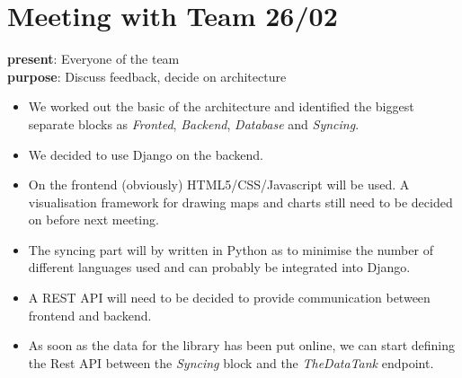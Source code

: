 \section{Meeting with Team 26/02}
{\bf present}: Everyone of the team\\
{\bf purpose}: Discuss feedback, decide on architecture\\
\begin{itemize}
  \item We worked out the basic of the architecture and identified the biggest separate blocks as \emph{Fronted}, \emph{Backend}, \emph{Database} and \emph{Syncing}.
  \item We decided to use Django on the backend.
  \item On the frontend (obviously) HTML5/CSS/Javascript will be used. A visualisation framework for drawing maps and charts still need to be decided on before next meeting.
  \item The syncing part will by written in Python as to minimise the number of different languages used and can probably be integrated into Django.
  \item A REST API will need to be decided to provide communication between frontend and backend.
  \item As soon as the data for the library has been put online, we can start defining the Rest API between the \emph{Syncing} block and the \emph{TheDataTank} endpoint.
\end{itemize}

